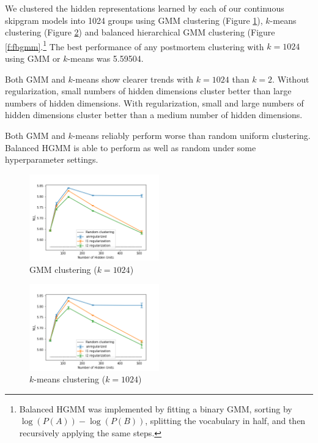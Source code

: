 \documentclass[11pt,letterpaper]{article}
\begin{document}
We clustered the hidden representations learned by each of our continuous skipgram models into 1024 groups using GMM clustering (Figure \ref{f:fgmm}), $k$-means clustering (Figure \ref{f:fkm}) and balanced hierarchical GMM clustering (Figure \ref{f:fbgmm}.\footnote{Balanced HGMM was implemented by fitting a binary GMM, sorting by $\log(P(A))-\log(P(B))$, splitting the vocabulary in half, and then recursively applying the same steps.} The best performance of any postmortem clustering with $k=1024$ using GMM or $k$-means was 5.59504.

Both GMM and $k$-means show clearer trends with $k=1024$ than $k=2$. Without regularization, small numbers of hidden dimensions cluster better than large numbers of hidden dimensions. With regularization, small and large numbers of hidden dimensions cluster better than a medium number of hidden dimensions.

Both GMM and $k$-means reliably perform worse than random uniform clustering. Balanced HGMM is able to perform as well as random under some hyperparameter settings.

\begin{figure}
  \caption{GMM clustering ($k=1024$)}
\label{f:fgmm}
  \centering
    \includegraphics[width=0.5\textwidth]{flat_gmm.png}
\end{figure}

\begin{figure}
  \caption{$k$-means clustering ($k=1024$)}
\label{f:fkm}
  \centering
    \includegraphics[width=0.5\textwidth]{flat_km.png}
\end{figure}
\end{document}
